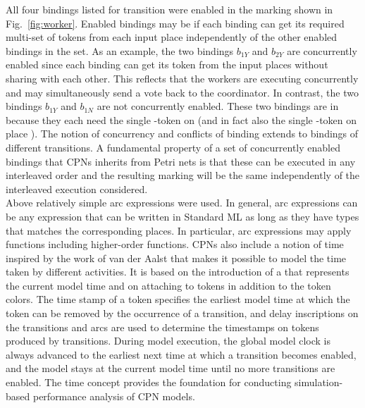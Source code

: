All four bindings listed for transition 
were enabled in the marking shown in Fig.~\ref{fig:worker}. Enabled
bindings may be  if each binding can get
its required multi-set of tokens from each input place independently
of the other enabled bindings in the set. As an example, the two
bindings $b_{1Y}$ and $b_{2Y}$ are concurrently enabled since each
binding can get its token from the input places without sharing with
each other. This reflects that the workers are executing concurrently
and may simultaneously send a vote back to the coordinator. In
contrast, the two bindings $b_{1Y}$ and $b_{1N}$ are not concurrently
enabled. These two bindings are in  because they
each need the single -token on  (and in
fact also the single -token on place
). The notion of concurrency and conflicts of binding
extends to bindings of different transitions. A fundamental property
of a set of concurrently enabled bindings that CPNs inherits from Petri
nets is that these can be executed in any interleaved order and the
resulting marking will be the same independently of the interleaved
execution considered.\\

 Above relatively simple arc expressions were used. In general, arc
 expressions can be any expression that can be written in Standard ML
 as long as they have types that matches the corresponding places. In
 particular, arc expressions may apply functions including
 higher-order functions. CPNs also include a notion of time inspired
 by the work of van der Aalst \cite{X} that makes it possible to model
 the time taken by different activities. It is based on the
 introduction of a  that represents the current
 model time and on attaching  to tokens in
 addition to the token colors. The time stamp of a token specifies the
 earliest model time at which the token can be removed by the
 occurrence of a transition, and delay inscriptions on the transitions
 and arcs are used to determine the timestamps on tokens produced by
 transitions. During model execution, the global model clock is always
 advanced to the earliest next time at which a transition becomes
 enabled, and the model stays at the current model time until no more
 transitions are enabled. The time concept provides the foundation for
 conducting simulation-based performance analysis of CPN models.


